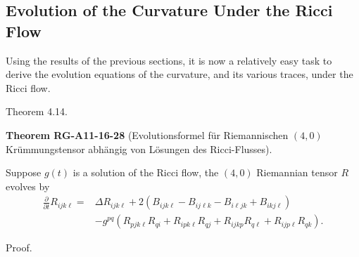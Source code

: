 \documentclass[10pt, letterpaper]{article}
\newcommand{\CustomHeading}[3]{%
  \par\medskip\noindent%
  \textbf{#1 #2} \textnormal{(#3)}.\enskip%
}
\newenvironment{THEO}[2]{\begin{unitbox}\CustomHeading{Theorem}{#1}{#2}}{\end{unitbox}}
\begin{document}
\pagebreak


\subsection*{Evolution of the Curvature Under the Ricci Flow}


Using the results of the previous sections, it is now a relatively easy task to derive the evolution equations of the curvature, and its various traces, under the Ricci flow.



Theorem 4.14. 

\begin{THEO}{RG-A11-16-28}{Evolutionsformel für Riemannischen $(4,0)$ Krümmungstensor abhängig von Lösungen des Ricci-Flusses}
Suppose $g(t)$ is a solution of the Ricci flow, the $(4,0)$ Riemannian tensor $R$ evolves by
$$
\begin{aligned}
\frac{\partial}{\partial t} R_{i j k \ell}= & \Delta R_{i j k \ell}+2\left(B_{i j k \ell}-B_{i j \ell k}-B_{i \ell j k}+B_{i k j \ell}\right) \\
& -g^{p q}\left(R_{p j k \ell} R_{q i}+R_{i p k \ell} R_{q j}+R_{i j k p} R_{q \ell}+R_{i j p \ell} R_{q k}\right) .
\end{aligned}
$$
\end{THEO}


Proof. 
\end{document}
